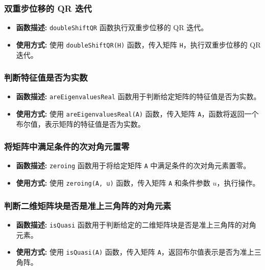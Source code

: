 \documentclass{article}
\begin{document}
\subsubsection*{双重步位移的 QR 迭代}
\begin{itemize}
	\item \textbf{函数描述:} \texttt{doubleShiftQR} 函数执行双重步位移的 QR 迭代。
	\item \textbf{使用方式:} 使用 \texttt{doubleShiftQR(H)} 函数，传入矩阵 \texttt{H}，执行双重步位移的 QR 迭代。
\end{itemize}

\subsubsection*{判断特征值是否为实数}
\begin{itemize}
	\item \textbf{函数描述:} \texttt{areEigenvaluesReal} 函数用于判断给定矩阵的特征值是否为实数。
	\item \textbf{使用方式:} 使用 \texttt{areEigenvaluesReal(A)} 函数，传入矩阵 \texttt{A}，函数将返回一个布尔值，表示矩阵的特征值是否为实数。
\end{itemize}


\subsubsection*{将矩阵中满足条件的次对角元置零}
\begin{itemize}
	\item \textbf{函数描述:} \texttt{zeroing} 函数用于将给定矩阵 \texttt{A} 中满足条件的次对角元素置零。
	\item \textbf{使用方式:} 使用 \texttt{zeroing(A, u)} 函数，传入矩阵 \texttt{A} 和条件参数 \(u\)，执行操作。
\end{itemize}

\subsubsection*{判断二维矩阵块是否是准上三角阵的对角元素}
\begin{itemize}
	\item \textbf{函数描述:} \texttt{isQuasi} 函数用于判断给定的二维矩阵块是否是准上三角阵的对角元素。
	\item \textbf{使用方式:} 使用 \texttt{isQuasi(A)} 函数，传入矩阵 \texttt{A}，返回布尔值表示是否为准上三角阵。
\end{itemize}
\end{document}
